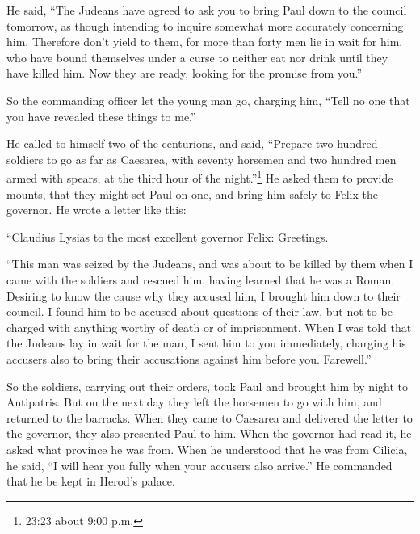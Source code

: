 \myverse{}He said, “The Judeans have agreed to ask you to bring Paul down
to the council tomorrow, as though intending to inquire somewhat more accurately concerning him.
\myverse{}Therefore don’t yield to them, for more than forty men lie in wait for him,
who have bound themselves under a curse to neither eat nor drink until they have killed him. Now they
are ready, looking for the promise from you.”

\myverse{}So the commanding officer let the young man go, charging him,
“Tell no one that you have revealed these things to me.”

\myverse{}He called to himself two of the centurions, and said, “Prepare
two hundred soldiers to go as far as Caesarea, with seventy horsemen and two hundred men armed with spears,
at the third hour of the night.”\footnote{23:23 about 9:00 p.m.}
\myverse{}He asked them to provide mounts, that they might set Paul on one, and bring
him safely to Felix the governor.
\myverse{}He wrote a letter like this:

\myverse{}“Claudius Lysias to the most excellent governor Felix: Greetings.

\myverse{}“This man was seized by the Judeans, and was about to be killed
by them when I came with the soldiers and rescued him, having learned that he was a Roman.
\myverse{}Desiring to know the cause why they accused him, I brought him down to their
council.
\myverse{}I found him to be accused about questions of their law, but not to be charged
with anything worthy of death or of imprisonment.
\myverse{}When I was told that the Judeans lay in wait for the man, I sent him to you
immediately, charging his accusers also to bring their accusations against him before you. Farewell.”

\myverse{}So the soldiers, carrying out their orders, took Paul and brought
him by night to Antipatris.
\myverse{}But on the next day they left the horsemen to go with him, and returned to
the barracks.
\myverse{}When they came to Caesarea and delivered the letter to the governor, they
also presented Paul to him.
\myverse{}When the governor had read it, he asked what province he was from. When he
understood that he was from Cilicia, he said,
\myverse{}“I will hear you fully when your accusers also arrive.” He commanded that
he be kept in Herod’s palace.


